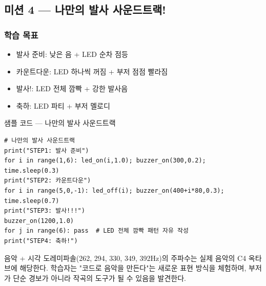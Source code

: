 \subsection{미션 4 --- 나만의 발사 사운드트랙!}
\label{subsec:ch11-m4}

\begin{storybox}
\end{storybox}

\subsubsection*{학습 목표}
\begin{itemize}[leftmargin=1.4em]
  \item 발사 준비: 낮은 음 + LED 순차 점등
  \item 카운트다운: LED 하나씩 꺼짐 + 부저 점점 빨라짐
  \item 발사!: LED 전체 깜빡 + 강한 발사음
  \item 축하: LED 파티 + 부저 멜로디
\end{itemize}

\begin{labbox}{샘플 코드 --- 나만의 발사 사운드트랙}
\begin{verbatim}
# 나만의 발사 사운드트랙
print("STEP1: 발사 준비")
for i in range(1,6): led_on(i,1.0); buzzer_on(300,0.2); time.sleep(0.3)
print("STEP2: 카운트다운")
for i in range(5,0,-1): led_off(i); buzzer_on(400+i*80,0.3); time.sleep(0.7)
print("STEP3: 발사!!!")
buzzer_on(1200,1.0)
for j in range(6): pass  # LED 전체 깜빡 패턴 자유 작성
print("STEP4: 축하!")
\end{verbatim}
\end{labbox}

\begin{notebox}{음악 + 시각}
도레미파솔(262, 294, 330, 349, 392Hz)의 주파수는 실제 음악의 C4 옥타브에
해당한다. 학습자는 "코드로 음악을 만든다"는 새로운 표현 방식을
체험하며, 부저가 단순 경보가 아니라 작곡의 도구가 될 수 있음을 발견한다.
\end{notebox}
